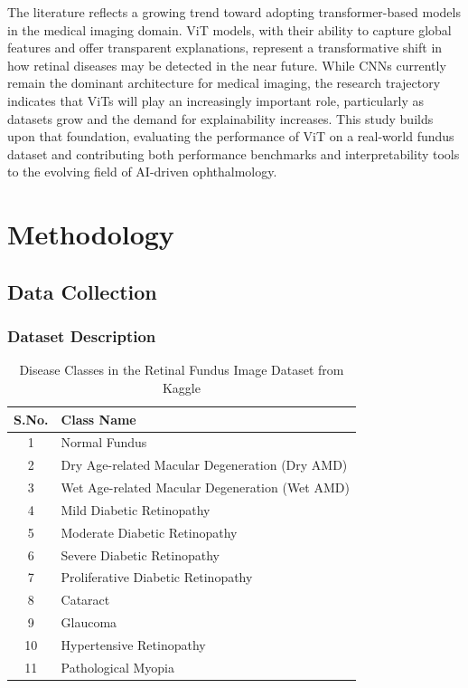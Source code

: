 \documentclass[a4paper,12pt]{report}
\begin{document}
The literature reflects a growing trend toward adopting transformer-based models in the medical imaging domain. ViT models, with their ability to capture global features and offer transparent explanations, represent a transformative shift in how retinal diseases may be detected in the near future. While CNNs currently remain the dominant architecture for medical imaging, the research trajectory indicates that ViTs will play an increasingly important role, particularly as datasets grow and the demand for explainability increases. This study builds upon that foundation, evaluating the performance of ViT on a real-world fundus dataset and contributing both performance benchmarks and interpretability tools to the evolving field of AI-driven ophthalmology.
\chapter{Methodology}

\section{Data Collection}

\subsection{Dataset Description}

\begin{table}[h!]
\centering
\begin{tabular}{|c|l|}
\hline
\textbf{S.No.} & \textbf{Class Name} \\
\hline
1 & Normal Fundus \\
2 & Dry Age-related Macular Degeneration (Dry AMD) \\
3 & Wet Age-related Macular Degeneration (Wet AMD) \\
4 & Mild Diabetic Retinopathy \\
5 & Moderate Diabetic Retinopathy \\
6 & Severe Diabetic Retinopathy \\
7 & Proliferative Diabetic Retinopathy \\
8 & Cataract \\
9 & Glaucoma \\
10 & Hypertensive Retinopathy \\
11 & Pathological Myopia \\
\hline
\end{tabular}
\caption{Disease Classes in the Retinal Fundus Image Dataset from Kaggle}
\label{tab:retinal_classes}
\end{table}
\end{document}
